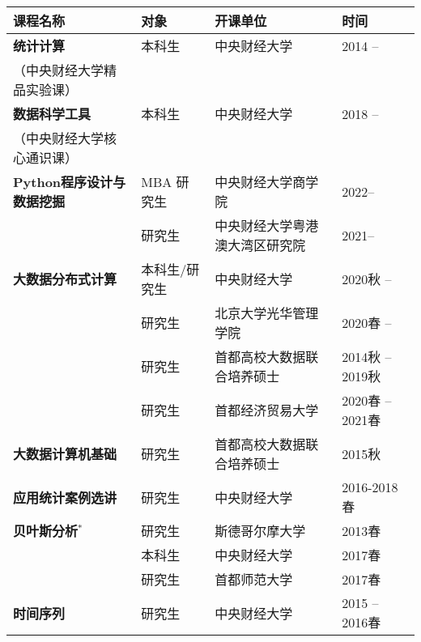 \documentclass[twoside,a4paper,11pt]{article}
\begin{document}
\begin{tabular}{l l ll}
  \toprule
  课程名称                                  & 对象          & 开课单位                       & 时间             \\
  \midrule
  \textbf{统计计算}                         & 本科生        & 中央财经大学                   & 2014 --          \\
  \footnotesize{（中央财经大学精品实验课）} &               &                                &                  \\
  \textbf{数据科学工具}                     & 本科生        & 中央财经大学                   & 2018 --          \\
  \footnotesize{（中央财经大学核心通识课）} &               &                                &                  \\
  \textbf{Python程序设计与数据挖掘}                   & MBA 研究生        & 中央财经大学商学院 & 2022--           \\
                     & 研究生        & 中央财经大学粤港澳大湾区研究院 & 2021--           \\
  \textbf{大数据分布式计算}                 & 本科生/研究生 & 中央财经大学                   & 2020秋 --        \\
                                            & 研究生        & 北京大学光华管理学院           & 2020春 --        \\
                                            & 研究生        & 首都高校大数据联合培养硕士     & 2014秋 -- 2019秋 \\
                                            & 研究生        & 首都经济贸易大学               & 2020春 --2021春        \\
  \textbf{大数据计算机基础}                 & 研究生        & 首都高校大数据联合培养硕士     & 2015秋           \\
  \textbf{应用统计案例选讲}                 & 研究生        & 中央财经大学                   & 2016-2018春      \\
  \textbf{贝叶斯分析}$^*$                   & 研究生        & 斯德哥尔摩大学                 & 2013春           \\
                                            & 本科生        & 中央财经大学                   & 2017春           \\
                                            & 研究生        & 首都师范大学                   & 2017春           \\
  \textbf{时间序列}                         & 研究生        & 中央财经大学                   & 2015 -- 2016春   \\

\end{tabular}
\end{document}
